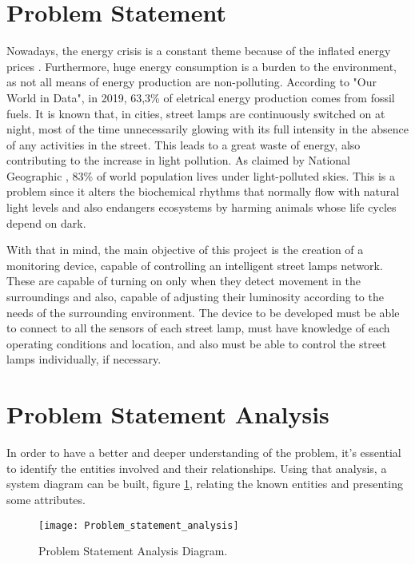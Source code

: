 \section{Problem Statement}
Nowadays, the energy crisis is a constant theme because of the inflated energy prices \cite{energy_crisis}. Furthermore, huge energy consumption is a burden to the environment, as not all means of energy production are non-polluting. According to "Our World in Data"\cite{owidenergy}, in 2019, 63,3\% of eletrical energy production comes from fossil fuels. It is known that, in cities, street lamps are continuously switched on at night, most of the time unnecessarily glowing with its full intensity in the absence of any activities in the street.  This leads to a great waste of energy, also contributing to the increase in light pollution. As claimed by National Geographic \cite{light_pollution}, 83\% of world population lives under light-polluted skies. This is a problem since it alters the biochemical rhythms that normally flow with natural light levels and also endangers ecosystems by harming animals whose life cycles depend on dark.

With that in mind, the main objective of this project is the creation of a monitoring device, capable of controlling an intelligent street lamps network. These are capable of turning on only when they detect movement in the surroundings and also, capable of adjusting their luminosity according to the needs of the surrounding environment. The device to be developed must be able to connect to all the sensors of each street lamp, must have knowledge of each operating conditions and location, and also must be able to control the street lamps individually, if necessary.

\section{Problem Statement Analysis}
In order to have a better and deeper understanding of the problem, it’s essential to identify the entities involved and their relationships. Using that analysis, a system diagram can be built, figure \ref{fig:Problem_statement_analysis}, relating the known entities and presenting some attributes.

\begin{figure}[ht]
	\centering
	\texttt{[image: Problem\_statement\_analysis]}
	\caption{Problem Statement Analysis Diagram.}
	\label{fig:Problem_statement_analysis}
\end{figure}

